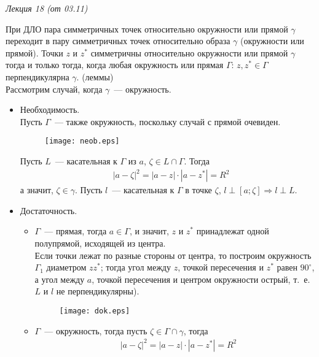 \begin{flushright}
    \textit{Лекция 18 (от 03.11)}
\end{flushright}
\theorem
При ДЛО пара симметричных точек относительно окружности или прямой $\gamma$
переходит в пару симметричных точек относительно образа $\gamma$ (окружности или
прямой).
\lemma
Точки $z$ и $z^*$ симметричны относительно окружности или прямой $\gamma$ тогда
и только тогда, когда любая окружность или прямая $\Gamma$: $z, z^* \in \Gamma$
перпендикулярна $\gamma$.
\pr (леммы)
\\
Рассмотрим случай, когда $\gamma$~--- окружность. 
\begin{itemize}
    \item Необходимость.
    \\
    Пусть $\Gamma$~--- также окружность, поскольку случай с прямой очевиден.
    \begin{figure}[h!]
        \centering
        \texttt{[image: neob.eps]}
        \label{fig:23.1}
    \end{figure}
    Пусть $L$~--- касательная к $\Gamma$ из $a$, $\zeta \in L \cap \Gamma$.
    Тогда
    \begin{align*}
      & \left| a - \zeta \right|^2 = \left| a-z \right|\cdot \left| a-z^* \right| = R^2
    \end{align*}
    а значит, $\zeta \in \gamma$. Пусть $l$~--- касательная к $\Gamma$ в точке
    $\zeta$, $l \perp [a;\zeta] \Rightarrow l \perp L$.
    \item Достаточность.
    \begin{itemize}
        \item $\Gamma$~--- прямая, тогда $a \in \Gamma$, и значит, $z$ и $z^*$
        принадлежат одной полупрямой, исходящей из центра.
        \\
        Если точки лежат по разные стороны от центра, то построим окружность
        $\Gamma_1$ диаметром $zz^*$; тогда угол между $z$, точкой пересечения и
        $z^*$ равен $90^{\circ}$, а угол между $a$, точкой пересечения и центром
        окружности острый, т.~е. $L$ и $l$ не перпендикулярны).
            \begin{figure}[h!]
        \centering
        \texttt{[image: dok.eps]}
        \label{fig:23}
    \end{figure}
        \item $\Gamma$~--- окружность, тогда пусть $\zeta \in \Gamma \cap
        \gamma$, тогда
        \begin{align*}
          & \left| a - \zeta \right|^2 = \left| a-z \right|\cdot \left| a-z^* \right| = R^2
        \end{align*}
    \end{itemize}
\end{itemize}
